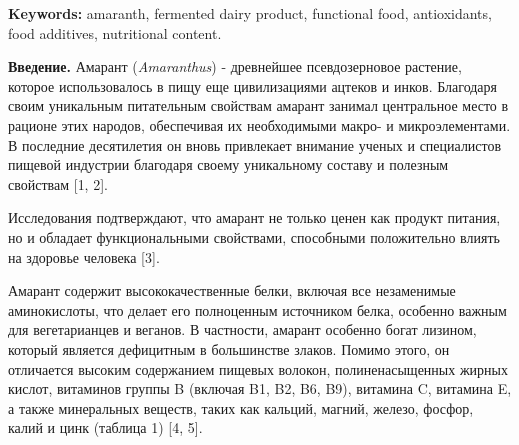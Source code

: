 {\bfseries Keywords:} amaranth, fermented dairy product, functional food,
antioxidants, food additives, nutritional content.

\begin{multicols}{2}
{\bfseries Введение.} Амарант (\emph{Amaranthus}) - древнейшее
псевдозерновое растение, которое использовалось в пищу еще цивилизациями
ацтеков и инков. Благодаря своим уникальным питательным свойствам
амарант занимал центральное место в рационе этих народов, обеспечивая их
необходимыми макро- и микроэлементами. В последние десятилетия он вновь
привлекает внимание ученых и специалистов пищевой индустрии благодаря
своему уникальному составу и полезным свойствам {[}1, 2{]}.

Исследования подтверждают, что амарант не только ценен как продукт
питания, но и обладает функциональными свойствами, способными
положительно влиять на здоровье человека {[}3{]}.

Амарант содержит высококачественные белки, включая все незаменимые
аминокислоты, что делает его полноценным источником белка, особенно
важным для вегетарианцев и веганов. В частности, амарант особенно богат
лизином, который является дефицитным в большинстве злаков. Помимо этого,
он отличается высоким содержанием пищевых волокон, полиненасыщенных
жирных кислот, витаминов группы B (включая B1, B2, B6, B9), витамина C,
витамина E, а также минеральных веществ, таких как кальций, магний,
железо, фосфор, калий и цинк (таблица 1) {[}4, 5{]}.
\end{multicols}

